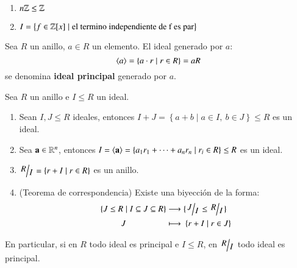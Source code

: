 \begin{eg}$ $
    \begin{enumerate}
        \item $n\mathbb{Z} \leq \mathbb{Z}$
        \item $I = \left\{ f \in \mathbb{Z}[x] \mid \text{el termino independiente de f es par} \right\}$
    \end{enumerate}
\end{eg}

\begin{dfn}
    Sea $R$ un anillo, $a \in R$ un elemento. El ideal generado por $a$:
    $$
        \langle a\rangle = \left\{a\cdot r \mid r \in R\right\} = aR
    $$
    se denomina \textbf{ideal principal} generado por $a$.
\end{dfn}

\begin{pro} Sea $ R $ un anillo e $ I \leq R $ un ideal.
    \begin{enumerate}
        \item Sean $I, J \leq R$ ideales, entonces $I+J = \left\{a+b \mid a \in I,\ b \in J\right\} \leq R$ es un ideal.
        \item Sea $\mathbf{a} \in \mathbb{R}^n$, entonces $I = \langle\mathbf{a}\rangle = \left\{ a_1r_1 + \cdots + a_nr_n \mid r_i \in R \right\} \leq R$ es un ideal.
        \item $\quo{R}{I} = \left\{r + I \mid r \in R\right\}$ es un anillo.
        \item \label{pro:correspondencia}(Teorema de correspondencia) Existe una biyección de la forma:
        \begin{align*}
            \{J \leq R \mid I \subseteq J \subseteq R\} &\longrightarrow \{\quo{J}{I} \leq \quo{R}{I}\}\\
             J \appad{80mu} &\longmapsto \appad{4mu} \{r + I \mid r \in J\}
        \end{align*}
    \end{enumerate}
\end{pro}

\begin{obs}
    En particular, si en $R$ todo ideal es principal e $I \leq R$, en $\quo{R}{I}$ todo ideal es principal.
\end{obs}

